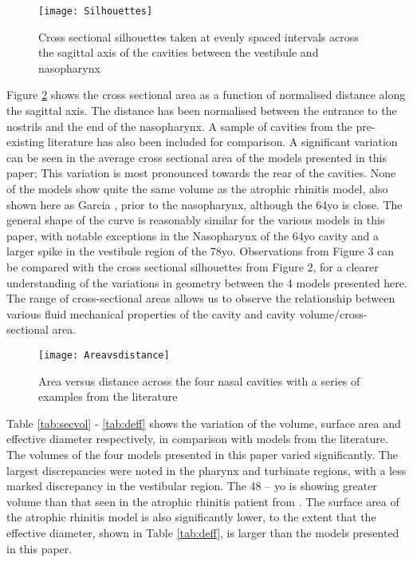 \begin{figure} 
  \texttt{[image: Silhouettes]}
  \caption{Cross sectional silhouettes taken at evenly spaced intervals across the sagittal axis of  the cavities between the vestibule and nasopharynx}
  \label{fig:sil}

\end{figure}

Figure \ref{fig:area} shows the cross sectional area as a function of normalised distance along the sagittal axis. The distance has been normalised between the entrance to the nostrils and the end of the nasopharynx. A sample of cavities from the pre-existing literature has also been included for comparison. A significant variation can be seen in the average cross sectional area of the models presented in this paper; This variation is most pronounced towards the rear of the cavities. None of the models show quite the same volume as the atrophic rhinitis model, also shown here as Garcia \cite{Garcia2007}, prior to the nasopharynx, although the 64yo is close. The general shape of the curve is reasonably similar for the various models in this paper, with notable exceptions in the Nasopharynx of the 64yo cavity and a larger spike in the vestibule region of the 78yo. Observations from Figure 3 can be compared with the cross sectional silhouettes from Figure 2, for a clearer understanding of the variations in geometry between the 4 models presented here. The range of cross-sectional areas allows us to observe the relationship between various fluid mechanical properties of the cavity and cavity volume/cross-sectional area.


\begin{figure}
  \texttt{[image: Areavsdistance]}
  \caption{Area versus distance across the four nasal cavities with a series of examples from the literature}
  \label{fig:area}
\end{figure}



Table \ref{tab:secvol} - \ref{tab:deff} shows the variation of the volume, surface area and effective diameter respectively, in comparison with models from the literature. The volumes of the four models presented in this paper varied significantly. The largest discrepancies were noted in the pharynx and turbinate regions, with a less marked discrepancy in the vestibular region. The 48 – yo is showing greater volume than that seen in the atrophic rhinitis patient from \cite{Garcia2007}. The surface area of the atrophic rhinitis model is also significantly lower, to the extent that the effective diameter, shown in Table \ref{tab:deff}, is larger than the models presented in this paper.

